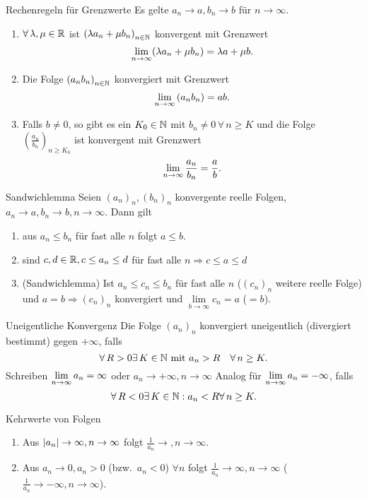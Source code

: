 \documentclass[main.tex]{subfiles}
\begin{document}
\begin{karte}{Rechenregeln für Grenzwerte}
    Es gelte \(a_n\rightarrow a, b_n \rightarrow b\) 
    für \(n\rightarrow\infty \).
	\begin{enumerate}
        \item \(\forall \lambda, \mu \in\R \) ist 
        \( {(\lambda a_n + \mu b_n)}_{n\in\mathbb{N}} \) 
        konvergent mit Grenzwert 
		\[\lim\limits_{n\rightarrow\infty} (\lambda a_n + \mu b_n) = \lambda a + \mu b.\]
        \item Die Folge \( {(a_n b_n)}_{n\in\mathbb{N}} \) 
        konvergiert mit Grenzwert 
		\[\lim\limits_{n\rightarrow\infty} {(a_n b_n)} = ab.\]
        \item Falls \(b\neq 0\), so gibt es ein 
        \( K_0 \in\mathbb{N} \) mit \(b_n \neq 0 \, \forall 
        \, n\geq K\) und die Folge 
        \( {\left(\frac{a_n}{b_n}\right)}_{n\geq K_0}\) 
        ist konvergent mit Grenzwert 
		\[\lim\limits_{n\rightarrow\infty} \frac{a_n}{b_n} = \frac{a}{b}.\]
	\end{enumerate}
\end{karte}
\begin{karte}{Sandwichlemma}
    Seien \( {(a_n)}_n, {(b_n)}_n\) konvergente 
    reelle Folgen, \( a_n\rightarrow a, 
    b_n \rightarrow b, n\rightarrow\infty \). Dann gilt
	\begin{enumerate}
            \item aus \(a_n\leq b_n\) für fast alle \(n\) 
            folgt \(a\leq b\).
            \item sind \(c,d\in\mathbb{R}, c\leq a_n\leq d \) für fast alle 
            \(n \Rightarrow c\leq a\leq d\)
            \item (Sandwichlemma) Ist \(a_n \leq c_n \leq b_n \) 
            für fast alle \(n\) (\( {(c_n)}_n \) weitere reelle Folge) 
            und \( a=b \Rightarrow {(c_n)}_n \) konvergiert und 
            \( \lim\limits_{b\rightarrow\infty}c_n = a \) (\( =b \)).
	\end{enumerate}
\end{karte}
\begin{karte}{Uneigentliche Konvergenz}
    Die Folge \( {(a_n)}_n \) konvergiert 
    uneigentlich (divergiert bestimmt) 
    gegen \(+\infty \), falls 
    \[ \forall R>0 \exists K\in\N 
    \text{ mit } a_n >R \quad \forall n\geq K. \]
    Schreiben \( \lim\limits_{n\rightarrow\infty} a_n = \infty \) 
    oder \( a_n \rightarrow +\infty, n\rightarrow \infty \)
	Analog für \( \lim\limits_{n\rightarrow\infty} a_n = -\infty \), falls 
	\[ \forall R<0 \exists K\in\N: a_n < R \forall n\geq K. \]
\end{karte}
\begin{karte}{Kehrwerte von Folgen}
    \begin{enumerate}
        \item Aus \( \left| a_n \right| \rightarrow \infty, 
        n\rightarrow\infty \) folgt \(\frac{1}{a_n} \rightarrow,
        n\rightarrow\infty \).
        \item Aus \( a_n\rightarrow 0, a_n > 0 \) 
        (bzw.\  \(a_n<0\)) \( \forall n \) folgt 
        \( \frac{1}{a_n} \rightarrow\infty, 
        n\rightarrow\infty \) (\( \frac{1}{a_n} 
        \rightarrow -\infty, n\rightarrow\infty \)).
	\end{enumerate}
\end{karte}
\end{document}
